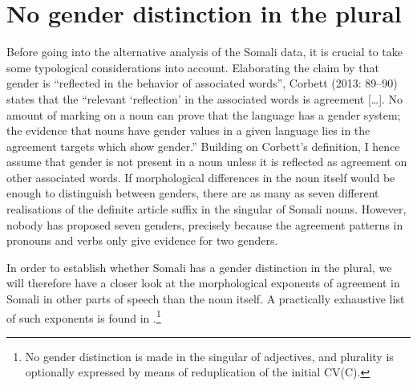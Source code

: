\documentclass[output=paper]{langsci/langscibook}
\begin{document}
\section{No gender distinction in the plural}

Before going into the alternative analysis of the Somali data, it is crucial to take some typological considerations into account. Elaborating the claim by \citet[231]{Hockett1958} that gender is “reflected in the behavior of associated words”, Corbett (2013: 89--90) states that the “relevant ‘reflection’ in the associated words is agreement […]. No amount of marking on a noun can prove that the language has a gender system; the evidence that nouns have gender values in a given language lies in the agreement targets which show gender.” Building on Corbett’s definition, I hence assume that gender is not present in a noun unless it is reflected as agreement on other associated words. If morphological differences in the noun itself would be enough to distinguish between genders, there are as many as seven different realisations of the definite article suffix in the singular of Somali nouns. However, nobody has proposed seven genders, precisely because the agreement patterns in pronouns and verbs only give evidence for two genders. 

In order to establish whether Somali has a gender distinction in the plural, we will therefore have a closer look at the morphological exponents of agreement in Somali in other parts of speech than the noun itself. A practically exhaustive list of such exponents is found in .\footnote{No gender distinction is made in the singular of adjectives, and plurality is optionally expressed by means of reduplication of the initial CV(C).}
\end{document}

